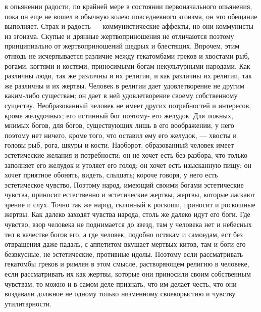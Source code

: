 \documentclass[12pt]{article}
\begin{document}
в опьянении радости, по крайней мере в состоянии первоначального опьянения, пока он еще не вошел в обычную колею повседневного эгоизма, он это обещание выполняет. Страх и радость --- коммунистические аффекты, но они коммунисты из эгоизма. Скупые и дрянные жертвоприношения не отличаются поэтому принципиально от жертвоприношений щедрых и блестящих. Впрочем, этим отнюдь не исчерпывается различие между гекатомбами греков и хвостами рыб, рогами, когтями и костями, приносимыми богам некультурными народами. Как различны люди, так же различны и их религии, и как различны их религии, так же различны и их жертвы. Человек в религии дает удовлетворение не другим каким-либо существам; он дает в ней удовлетворение своему собственному существу. Необразованный человек не имеет других потребностей и интересов, кроме желудочных; его истинный бог поэтому- его желудок. Для ложных, мнимых богов, для богов, существующих лишь в его воображении, у него поэтому нет ничего, кроме того, что оставил ему его желудок, --- хвосты и головы рыб, рога, шкуры и кости. Наоборот, образованный человек имеет эстетические желания и потребности; он не хочет есть без разбора, что только заполняет его желудок и утоляет его голод; он хочет есть изысканную пищу; он хочет приятное обонять, видеть, слышать; короче говоря, у него есть эстетическое чувство. Поэтому народ, имеющий своими богами эстетические чувства, приносит естественно и эстетические жертвы, жертвы, которые ласкают зрение и слух. Точно так же народ, склонный к роскоши, приносит и роскошные жертвы. Как далеко заходят чувства народа, столь же далеко идут его боги. Где чувство, взор человека не поднимается до звезд, там у человека нет и небесных тел в качестве богов его, а где человек, подобно остякам и самоедам, ест без отвращения даже падаль, с аппетитом вкушает мертвых китов, там и боги его безвкусные, не эстетические, противные идолы. Поэтому если рассматривать гекатомбы греков и римлян в этом смысле, растворяющем религию в человеке, если рассматривать их как жертвы, которые они приносили своим собственным чувствам, то можно и в самом деле признать, что им делает честь, что они воздавали должное не одному только низменному своекорыстию и чувству утилитарности. 
\end{document}
